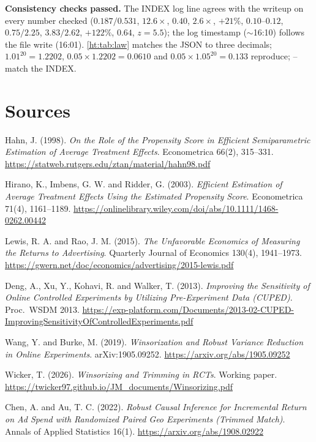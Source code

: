 \begin{reviewernote}[(compiler)]
\textbf{Consistency checks passed.} The INDEX log line agrees with the writeup on every number checked ($0.187/0.531$, $12.6\times$, $0.40$, $2.6\times$, $+21\%$, $0.10$--$0.12$, $0.75/2.25$, $3.83/2.62$, $+122\%$, $0.64$, $z = 5.5$); the log timestamp ($\sim$16:10) follows the file write (16:01). \cref{ht:tab:law} matches the JSON to three decimals; $1.01^{20} = 1.2202$, $0.05 \times 1.2202 = 0.0610$ and $0.05 \times 1.05^{20} = 0.133$ reproduce; -- match the INDEX.
\end{reviewernote}

\section*{Sources}
\begingroup\raggedright
\begin{enumerate}[label={[\arabic*]},leftmargin=2.5em]
\item Hahn, J. (1998). \emph{On the Role of the Propensity Score in Efficient Semiparametric Estimation of Average Treatment Effects}. Econometrica 66(2), 315--331. \url{https://statweb.rutgers.edu/ztan/material/hahn98.pdf}
\item Hirano, K., Imbens, G. W. and Ridder, G. (2003). \emph{Efficient Estimation of Average Treatment Effects Using the Estimated Propensity Score}. Econometrica 71(4), 1161--1189. \url{https://onlinelibrary.wiley.com/doi/abs/10.1111/1468-0262.00442}
\item Lewis, R. A. and Rao, J. M. (2015). \emph{The Unfavorable Economics of Measuring the Returns to Advertising}. Quarterly Journal of Economics 130(4), 1941--1973. \url{https://gwern.net/doc/economics/advertising/2015-lewis.pdf}
\item Deng, A., Xu, Y., Kohavi, R. and Walker, T. (2013). \emph{Improving the Sensitivity of Online Controlled Experiments by Utilizing Pre-Experiment Data (CUPED)}. Proc.\ WSDM 2013. \url{https://exp-platform.com/Documents/2013-02-CUPED-ImprovingSensitivityOfControlledExperiments.pdf}
\item Wang, Y. and Burke, M. (2019). \emph{Winsorization and Robust Variance Reduction in Online Experiments}. arXiv:1905.09252. \url{https://arxiv.org/abs/1905.09252}
\item Wicker, T. (2026). \emph{Winsorizing and Trimming in RCTs}. Working paper. \url{https://twicker97.github.io/JM_documents/Winsorizing.pdf}
\item Chen, A. and Au, T. C. (2022). \emph{Robust Causal Inference for Incremental Return on Ad Spend with Randomized Paired Geo Experiments (Trimmed Match)}. Annals of Applied Statistics 16(1). \url{https://arxiv.org/abs/1908.02922}

\end{enumerate}
